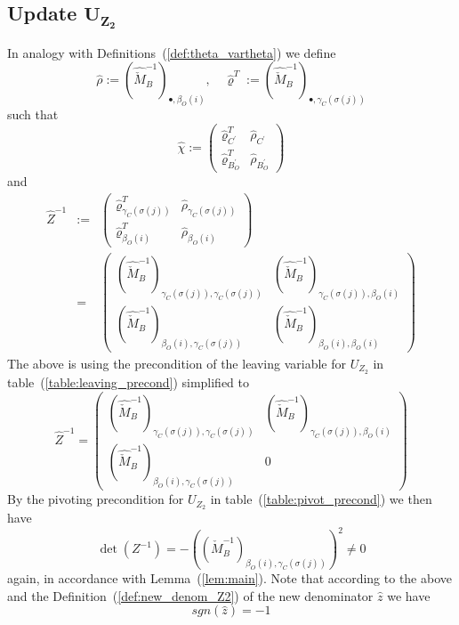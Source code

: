 \documentclass[a4paper]{article}
\begin{document}
\subsection{Update $\mathbf{U_{Z_{2}}}$}
In analogy with Definitions~(\ref{def:theta_vartheta}) we define
\begin{equation}
\label{def:rho_hat_varrho_hat}
\hat{\rho}:=\left(\hat{\check{M}}_{B}^{-1}\right)_{\bullet, \beta_{O}(i)},
\quad
\hat{\varrho}^{T}
:=
\left(\hat{\check{M}}_{B}^{-1}\right)_{\bullet, \gamma_{C}(\sigma(j))}
\end{equation}
such that
\begin{equation}
\hat{\chi}:=
\left(
\begin{array}{c|c}
\hat{\varrho}_{C^{\prime}}^{T}     & \hat{\rho}_{C^{\prime}} \\
\hline
\hat{\varrho}_{B_{O}^{\prime}}^{T} & \hat{\rho}_{B_{O}^{\prime}}
\end{array}
\right)
\end{equation}
and
\begin{eqnarray}
\hat{Z}^{-1}
&:=&
\left(
\begin{array}{c|c}
\hat{\varrho}_{\gamma_{C}(\sigma(j))}^{T}
&
\hat{\rho}_{\gamma_{C}(\sigma(j))} \\
\hline
\hat{\varrho}_{\beta_{O}(i)}^{T}
&
\hat{\rho}_{\beta_{O}(i)}
\end{array}
\right)
\nonumber \\
&=&
\left(
\begin{array}{c|c}
\left(
  \hat{\check{M}}_{B}^{-1}
\right)_{\gamma_{C}(\sigma(j)), \gamma_{C}(\sigma(j))}
&
\left(\hat{\check{M}}_{B}^{-1}\right)_{\gamma_{C}(\sigma(j)), \beta_{O}(i)}
\\
\hline
\left(\hat{\check{M}}_{B}^{-1}\right)_{\beta_{O}(i), \gamma_{C}(\sigma(j))}
&
\left(\hat{\check{M}}_{B}^{-1}\right)_{\beta_{O}(i), \beta_{O}(i)}
\end{array}
\right) 
\end{eqnarray}
The above is using the precondition of the leaving variable for $U_{Z_{2}}$ in
table~(\ref{table:leaving_precond}) simplified to
\begin{equation}
\hat{Z}^{-1}=
\left(
\begin{array}{c|c}
\left(
  \hat{\check{M}}_{B}^{-1}
\right)_{\gamma_{C}(\sigma(j)), \gamma_{C}(\sigma(j))}
&
\left(\hat{\check{M}}_{B}^{-1}\right)_{\gamma_{C}(\sigma(j)), \beta_{O}(i)}
\\
\hline
\left(\hat{\check{M}}_{B}^{-1}\right)_{\beta_{O}(i), \gamma_{C}(\sigma(j))}
&
0
\end{array}
\right) 
\end{equation}
By the pivoting precondition for $U_{Z_{2}}$ in 
table~(\ref{table:pivot_precond}) we then have
\begin{equation}
\det(Z^{-1}) =
-\left( 
\left(\check{M}_{B}^{-1}\right)_{\beta_{O}(i),\gamma_{C}(\sigma(j))}
\right)^{2}
\neq 0
\end{equation}
again, in accordance with Lemma~(\ref{lem:main}). Note that according to the above and
the Definition~(\ref{def:new_denom_Z2}) of the new denominator $\hat{z}$
we have 
\begin{equation}
\label{eq:sign_of_new_denom_Z2}
sgn(\hat{z})=-1
\end{equation}
\end{document}
